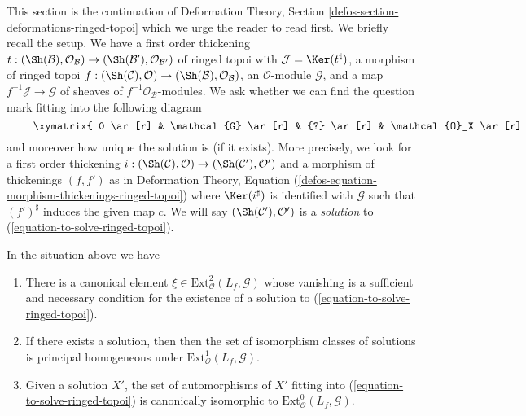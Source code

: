 \noindent
This section is the continuation of
Deformation Theory, Section \ref{defos-section-deformations-ringed-topoi}
which we urge the reader to read first. We briefly recall the setup.
We have a first order thickening
$t : (\Sh(\mathcal{B}), \mathcal{O}_\mathcal{B}) \to
(\Sh(\mathcal{B}'), \mathcal{O}_{\mathcal{B}'})$ of ringed topoi
with $\mathcal{J} = \Ker(t^\sharp)$, a morphism of ringed topoi
$f : (\Sh(\mathcal{C}), \mathcal{O}) \to
(\Sh(\mathcal{B}), \mathcal{O}_\mathcal{B})$, an $\mathcal{O}$-module
$\mathcal{G}$, and a map $f^{-1}\mathcal{J} \to \mathcal{G}$
of sheaves of $f^{-1}\mathcal{O}_\mathcal{B}$-modules.
We ask whether we can find
the question mark fitting into the following diagram
\begin{equation}
\label{equation-to-solve-ringed-topoi}
\vcenter{
\xymatrix{
0 \ar[r] & \mathcal{G} \ar[r] & {?} \ar[r] & \mathcal{O}_X \ar[r] & 0 \\
0 \ar[r] & f^{-1}\mathcal{J} \ar[u]^c \ar[r] &
f^{-1}\mathcal{O}_{S'} \ar[u] \ar[r] &
f^{-1}\mathcal{O}_S \ar[u] \ar[r] & 0
}
}
\end{equation}
and moreover how unique the solution is (if it exists). More precisely,
we look for a first order thickening
$i : (\Sh(\mathcal{C}), \mathcal{O}) \to (\Sh(\mathcal{C}'), \mathcal{O}')$
and a morphism of thickenings $(f, f')$ as in
Deformation Theory, Equation
(\ref{defos-equation-morphism-thickenings-ringed-topoi})
where $\Ker(i^\sharp)$ is identified with $\mathcal{G}$
such that $(f')^\sharp$ induces the given map $c$.
We will say $(\Sh(\mathcal{C}'), \mathcal{O}')$ is a {\it solution} to
(\ref{equation-to-solve-ringed-topoi}).

\begin{lemma}
\label{lemma-find-obstruction-ringed-topoi}
In the situation above we have
\begin{enumerate}
\item There is a canonical element
$\xi \in \text{Ext}^2_\mathcal{O}(L_f, \mathcal{G})$
whose vanishing is a sufficient and necessary condition for the existence
of a solution to (\ref{equation-to-solve-ringed-topoi}).
\item If there exists a solution, then then the set of
isomorphism classes of solutions is principal homogeneous under
$\text{Ext}^1_\mathcal{O}(L_f, \mathcal{G})$.
\item Given a solution $X'$, the set of automorphisms of $X'$
fitting into (\ref{equation-to-solve-ringed-topoi}) is canonically isomorphic
to $\text{Ext}^0_\mathcal{O}(L_f, \mathcal{G})$.
\end{enumerate}
\end{lemma}

